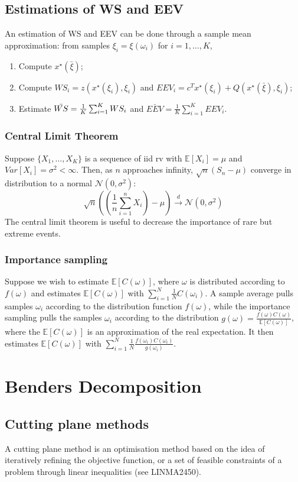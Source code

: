 \documentclass[12pt, openany]{report}
\newcommand{\E}{\mathbb{E}}
\theoremstyle{definition}
\begin{document}
\section{Estimations of WS and EEV}
An estimation of WS and EEV can be done through a sample mean approximation: from samples $\xi_i = \xi(\omega_i)$ for $i=1,\dots,K$, 
\begin{enumerate}
	\item Compute $x^\star (\bar \xi)$;
	\item Compute $WS_i = z(x^\star (\xi_i), \xi_i)$ and $EEV_i = c^Tx^\star (\xi_i) + Q(x^\star (\bar \xi), \xi_i)$;
	\item Estimate $\Bar{WS} = \frac{1}{K}\sum_{i=1}^K WS_i$ and $\bar{EEV} = \frac{1}{K}\sum_{i=1}^K EEV_i$.  
\end{enumerate}
\subsection{Central Limit Theorem}
Suppose $\{X_1, \dots, X_K\}$ is a sequence of iid rv with $\E[X_i]=\mu$ and $Var[X_i] = \sigma^2<\infty$. Then, as $n$ approaches infinity, $\sqrt{n}(S_n-\mu)$ converge in distribution to a normal $\mathcal{N}(0,\sigma^2)$:
\begin{equation}
	\sqrt{n}\left(\left(\frac{1}{n}\sum_{i=1}^n X_i\right)-\mu\right) \xrightarrow{d} \mathcal{N}(0,\sigma^2)
\end{equation}
The central limit theorem is useful to decrease the importance of rare but extreme events. 
\subsection{Importance sampling}
Suppose we wish to estimate $\E[C(\omega)]$, where $\omega$ is distributed according to $f(\omega)$ and estimates $\E[C(\omega)]$ with $\displaystyle \sum_{i=1}^N \frac{1}{N}C(\omega_i)$. A sample average pulls samples $\omega_i$ according to the distribution function $f(\omega)$, while the importance sampling pulls the samples $\omega_i$ according to the distribution $\displaystyle g(\omega) = \frac{f(\omega)C(\omega)}{\E[C(\omega)]}$, where the $\E[C(\omega)]$ is an approximation of the real expectation. It then estimates $\E[C(\omega)]$ with $\displaystyle \sum_{i=1}^N \frac{1}{N}\frac{f(\omega_i)C(\omega_i)}{g(\omega_i)}$. 
\chapter{Benders Decomposition}
\section{Cutting plane methods}
A cutting plane method is an optimisation method based on the idea of iteratively refining the objective function, or a set of feasible constraints of a problem through linear inequalities (see LINMA2450). 
\end{document}
